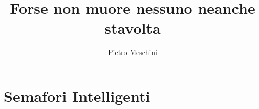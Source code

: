 \documentclass[10pt,a4paper,twoside]{book}
\author{Pietro Meschini}
\title{Forse non muore nessuno neanche stavolta}
\begin{document}
\chapter{Semafori Intelligenti}
\end{document}
